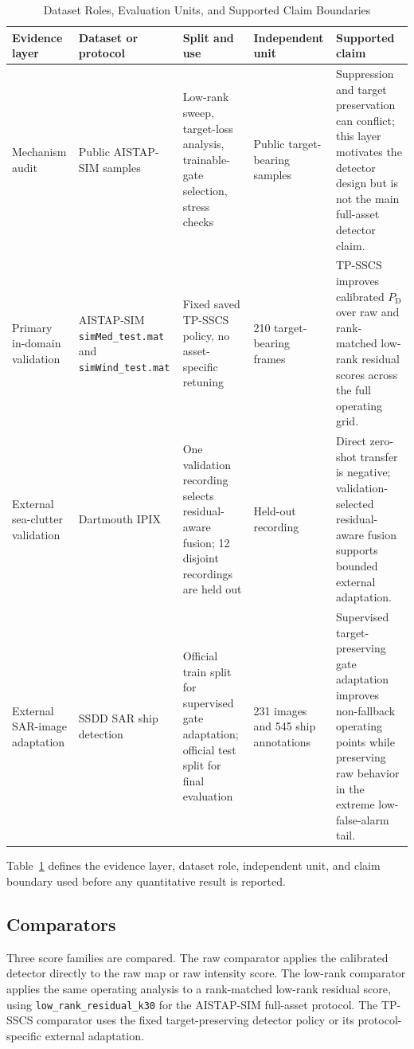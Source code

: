 \documentclass[journal]{IEEEtran}
\begin{document}
\begin{table}[!t]
\caption{Dataset Roles, Evaluation Units, and Supported Claim Boundaries}
\label{tab:dataset-protocol}
\centering
\footnotesize
\renewcommand{\arraystretch}{1.15}
\begin{tabular}{@{}p{}p{}p{}p{}p{}@{}}
\toprule
Evidence layer & Dataset or protocol & Split and use & Independent unit & Supported claim \\
\midrule
Mechanism audit & Public AISTAP-SIM samples & Low-rank sweep, target-loss analysis, trainable-gate selection, stress checks & Public target-bearing samples & Suppression and target preservation can conflict; this layer motivates the detector design but is not the main full-asset detector claim. \\
Primary in-domain validation & AISTAP-SIM \texttt{simMed\_test.mat} and \texttt{simWind\_test.mat} & Fixed saved TP-SSCS policy, no asset-specific retuning & 210 target-bearing frames & TP-SSCS improves calibrated $P_{\mathrm{D}}$ over raw and rank-matched low-rank residual scores across the full operating grid. \\
External sea-clutter validation & Dartmouth IPIX & One validation recording selects residual-aware fusion; 12 disjoint recordings are held out & Held-out recording & Direct zero-shot transfer is negative; validation-selected residual-aware fusion supports bounded external adaptation. \\
External SAR-image adaptation & SSDD SAR ship detection & Official train split for supervised gate adaptation; official test split for final evaluation & 231 images and 545 ship annotations & Supervised target-preserving gate adaptation improves non-fallback operating points while preserving raw behavior in the extreme low-false-alarm tail. \\
\bottomrule
\end{tabular}
\vspace{0.35em}
\parbox{0.94\textwidth}{\scriptsize Table~\ref{tab:dataset-protocol} defines the evidence layer, dataset role, independent unit, and claim boundary used before any quantitative result is reported.}
\end{table}

\subsection{Comparators}

Three score families are compared. The raw comparator applies the calibrated detector directly to the raw map or raw intensity score. The low-rank comparator applies the same operating analysis to a rank-matched low-rank residual score, using \texttt{low\_rank\_residual\_k30} for the AISTAP-SIM full-asset protocol. The TP-SSCS comparator uses the fixed target-preserving detector policy or its protocol-specific external adaptation.
\end{document}
